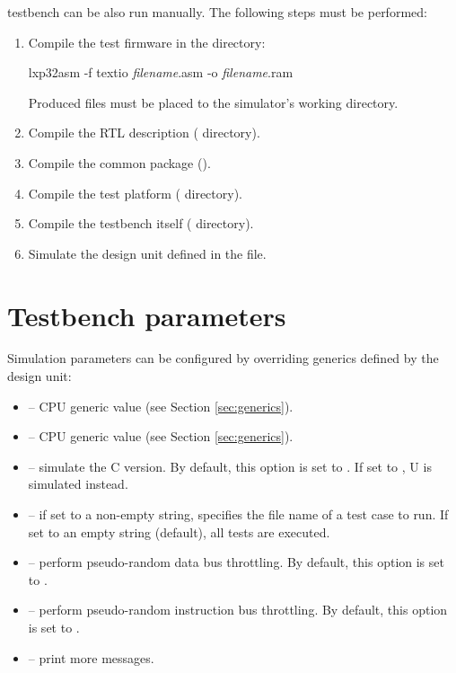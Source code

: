 \documentclass[a4paper,12pt,twoside,extrafontsizes]{memoir}
\begin{document}
\lxp{} testbench can be also run manually. The following steps must be performed:

\begin{enumerate}
	\item Compile the test firmware in the  directory:
	
	\begin{codepar}
    lxp32asm -f textio \emph{filename}.asm -o \emph{filename}.ram
	\end{codepar}
	
	Produced  files must be placed to the simulator's working directory.
	\item Compile the \lxp{} RTL description ( directory).
	\item Compile the common package ().
	\item Compile the test platform ( directory).
	\item Compile the testbench itself ( directory).
	\item Simulate the  design unit defined in the  file.
\end{enumerate}

\section{Testbench parameters}

Simulation parameters can be configured by overriding generics defined by the  design unit:

\begin{itemize}
	\item {} --  CPU generic value (see Section \ref{sec:generics}).
	\item {} --  CPU generic value (see Section \ref{sec:generics}).
	\item {} -- simulate the \lxp{}C version. By default, this option is set to . If set to , \lxp{}U is simulated instead.
	\item {} -- if set to a non-empty string, specifies the file name of a test case to run. If set to an empty string (default), all tests are executed.
	\item {} -- perform pseudo-random data bus throttling. By default, this option is set to .
	\item {} -- perform pseudo-random instruction bus throttling. By default, this option is set to .
	\item {} -- print more messages.
\end{itemize}
\end{document}
